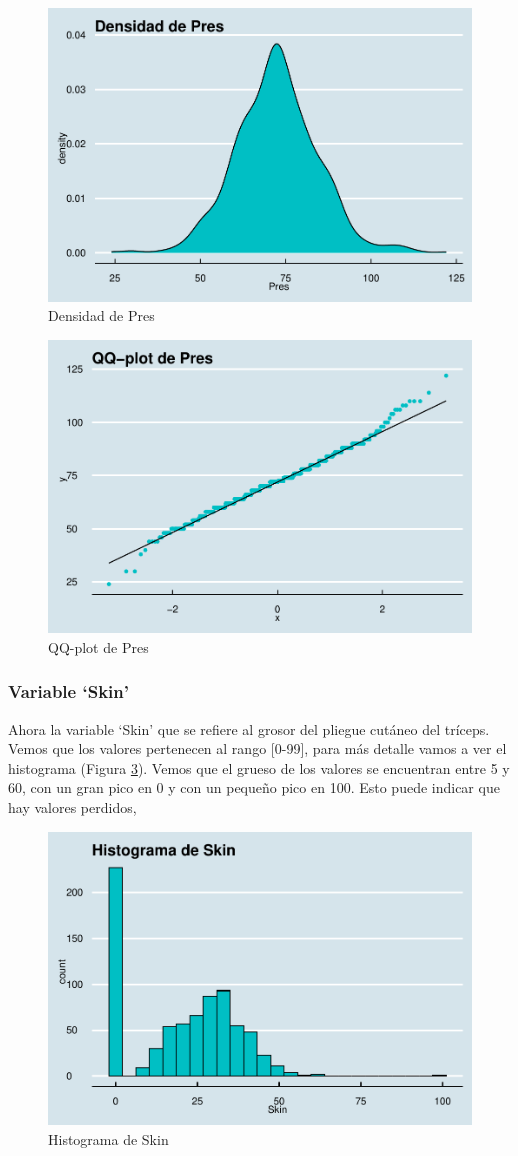 \documentclass[
]{article}
\begin{document}
\begin{figure}

{\centering \includegraphics[width=0.5\linewidth]{pima-clasificacion_files/figure-latex/densidad_pres-1} 

}

\caption{Densidad de Pres}\label{fig:densidad_pres}
\end{figure}
\begin{figure}

{\centering \includegraphics[width=0.5\linewidth]{pima-clasificacion_files/figure-latex/qq_pres-1} 

}

\caption{QQ-plot de Pres}\label{fig:qq_pres}
\end{figure}

\hypertarget{variable-skin}{%
\subsubsection{Variable `Skin'}\label{variable-skin}}

Ahora la variable `Skin' que se refiere al grosor del pliegue cutáneo
del tríceps. Vemos que los valores pertenecen al rango {[}0-99{]}, para
más detalle vamos a ver el histograma (Figura \ref{fig:hist_skin}).
Vemos que el grueso de los valores se encuentran entre 5 y 60, con un
gran pico en 0 y con un pequeño pico en 100. Esto puede indicar que hay
valores perdidos,

\begin{figure}

{\centering \includegraphics[width=0.5\linewidth]{pima-clasificacion_files/figure-latex/hist_skin-1} 

}

\caption{Histograma de Skin}\label{fig:hist_skin}
\end{figure}
\end{document}
